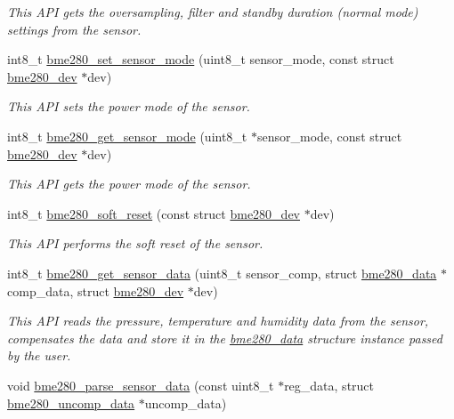 \begin{DoxyCompactItemize}
\begin{DoxyCompactList}\small\item\em This A\+PI gets the oversampling, filter and standby duration (normal mode) settings from the sensor. \end{DoxyCompactList}\item 
int8\+\_\+t \hyperlink{group___b_m_e280_ga17a0eaeb97e43233af3e6aac8bd426d4}{bme280\+\_\+set\+\_\+sensor\+\_\+mode} (uint8\+\_\+t sensor\+\_\+mode, const struct \hyperlink{structbme280__dev}{bme280\+\_\+dev} $\ast$dev)
\begin{DoxyCompactList}\small\item\em This A\+PI sets the power mode of the sensor. \end{DoxyCompactList}\item 
int8\+\_\+t \hyperlink{group___b_m_e280_ga4e9e8d290d842abb3262591ff9f64bc4}{bme280\+\_\+get\+\_\+sensor\+\_\+mode} (uint8\+\_\+t $\ast$sensor\+\_\+mode, const struct \hyperlink{structbme280__dev}{bme280\+\_\+dev} $\ast$dev)
\begin{DoxyCompactList}\small\item\em This A\+PI gets the power mode of the sensor. \end{DoxyCompactList}\item 
int8\+\_\+t \hyperlink{group___b_m_e280_ga90dd2358e7050455585842a0fd468f97}{bme280\+\_\+soft\+\_\+reset} (const struct \hyperlink{structbme280__dev}{bme280\+\_\+dev} $\ast$dev)
\begin{DoxyCompactList}\small\item\em This A\+PI performs the soft reset of the sensor. \end{DoxyCompactList}\item 
int8\+\_\+t \hyperlink{group___b_m_e280_ga6671fea2c1e01f40029a653b9ab4410d}{bme280\+\_\+get\+\_\+sensor\+\_\+data} (uint8\+\_\+t sensor\+\_\+comp, struct \hyperlink{structbme280__data}{bme280\+\_\+data} $\ast$comp\+\_\+data, struct \hyperlink{structbme280__dev}{bme280\+\_\+dev} $\ast$dev)
\begin{DoxyCompactList}\small\item\em This A\+PI reads the pressure, temperature and humidity data from the sensor, compensates the data and store it in the \hyperlink{structbme280__data}{bme280\+\_\+data} structure instance passed by the user. \end{DoxyCompactList}\item 
void \hyperlink{group___b_m_e280_ga84be45ccf7a3a82138ff2170123462c3}{bme280\+\_\+parse\+\_\+sensor\+\_\+data} (const uint8\+\_\+t $\ast$reg\+\_\+data, struct \hyperlink{structbme280__uncomp__data}{bme280\+\_\+uncomp\+\_\+data} $\ast$uncomp\+\_\+data)

\end{DoxyCompactItemize}
